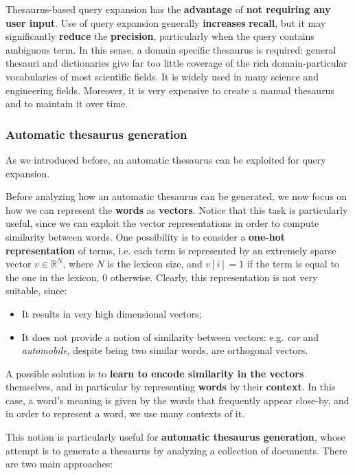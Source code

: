 Thesaurus-based query expansion has the \textbf{advantage} of \textbf{not requiring any user input}. Use of query expansion generally \textbf{increases} \textbf{recall}, but it may significantly \textbf{reduce} the \textbf{precision}, particularly when the query contains ambiguous term. In this sense, a domain specific thesaurus is required: general thesauri and dictionaries give far too little coverage of the rich domain-particular vocabularies of most scientific fields. It is widely used in many science and engineering fields. Moreover, it is very expensive to create a manual thesaurus and to maintain it over time.

\subsubsection{Automatic thesaurus generation}
As we introduced before, an automatic thesaurus can be exploited for query expansion. 

Before analyzing how an automatic thesaurus can be generated, we now focus on how we can represent the \textbf{words} as \textbf{vectors}. Notice that this task is particularly useful, since we can exploit the vector representations in order to compute similarity between words. One possibility is to consider a \textbf{one-hot representation} of terms, i.e. each term is represented by an extremely sparse vector $v \in \mathbb{R}^N$, where $N$ is the lexicon size, and $v[i] = 1$ if the term is equal to the one in the lexicon, 0 otherwise. Clearly, this representation is not very suitable, since:

\begin{itemize}
    \item It results in very high dimensional vectors;
    \item It does not provide a notion of similarity between vectors: e.g. \textit{car} and \textit{automobile}, despite being two similar words, are orthogonal vectors.
\end{itemize}

A possible solution is to \textbf{learn to encode similarity in the vectors} themselves, and in particular by representing \textbf{words} by their \textbf{context}. In this case, a word's meaning is given by the words that frequently appear close-by, and in order to represent a word, we use many contexts of it.

This notion is particularly useful for \textbf{automatic thesaurus generation}, whose attempt is to generate a thesaurus by analyzing a collection of documents. There are two main approaches:


